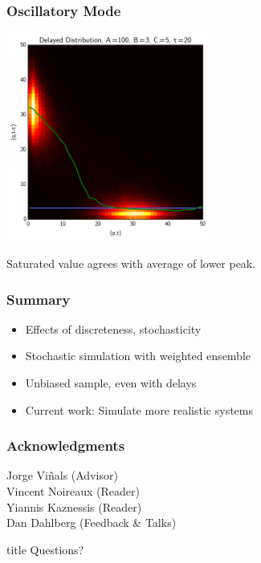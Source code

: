 \documentclass[xcolor={usenames,dvipsnames,svgnames}]{beamer}
\begin{document}
\begin{frame}
    \frametitle{Oscillatory Mode}

    \begin{center}
        \includegraphics[width=0.5\textwidth]{../results/presentation/ddjd-ca-a100-c5-t20.png}
    \end{center}

    Saturated value agrees with average of lower peak.
\end{frame}

\begin{frame}
    \frametitle{Summary}
    \begin{itemize}
        \item Effects of discreteness, stochasticity
        \item Stochastic simulation with weighted ensemble
        \item Unbiased sample, even with delays
        \item Current work: Simulate more realistic systems
    \end{itemize}
\end{frame}

\begin{frame}
    \frametitle{Acknowledgments}
    Jorge Viñals (Advisor)\\[2ex]

    Vincent Noireaux (Reader)\\
    Yiannis Kaznessis (Reader)\\[2ex]

    Dan Dahlberg (Feedback \& Talks)
\end{frame}

\begin{frame}[plain]

\hfill
    \begin{beamercolorbox}[rounded=true, center, shadow=true,wd=6cm]{title}
        \huge Questions?
    \end{beamercolorbox}
\hfill\hfill

\end{frame}
\end{document}
